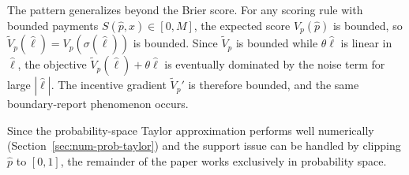 \documentclass[11pt]{article}
\begin{document}
The pattern generalizes beyond the Brier score. For any scoring rule with bounded payments $S(\hat{p}, x) \in [0, M]$, the expected score $V_p(\hat{p})$ is bounded, so $\tilde{V}_p(\hat{\ell}) = V_p(\sigma(\hat{\ell}))$ is bounded. Since $\tilde{V}_p$ is bounded while $\theta\hat{\ell}$ is linear in $\hat{\ell}$, the objective $\tilde{V}_p(\hat{\ell}) + \theta\hat{\ell}$ is eventually dominated by the noise term for large $|\hat{\ell}|$. The incentive gradient $\tilde{V}_p'$ is therefore bounded, and the same boundary-report phenomenon occurs.

\medskip
Since the probability-space Taylor approximation performs well numerically (Section~\ref{sec:num-prob-taylor}) and the support issue can be handled by clipping $\hat{p}$ to $[0,1]$, the remainder of the paper works exclusively in probability space.
\end{document}
